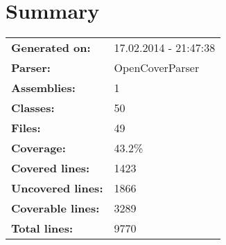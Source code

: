 \documentclass[a4paper,10pt]{article}
\begin{document}
\setcounter{secnumdepth}{-1}
\section{Summary}
\begin{longtable}[l]{ll}
\textbf{Generated on:} & 17.02.2014 - 21:47:38\\
\textbf{Parser:} & OpenCoverParser\\
\textbf{Assemblies:} & 1\\
\textbf{Classes:} & 50\\
\textbf{Files:} & 49\\
\textbf{Coverage:} & 43.2\%\\
\textbf{Covered lines:} & 1423\\
\textbf{Uncovered lines:} & 1866\\
\textbf{Coverable lines:} & 3289\\
\textbf{Total lines:} & 9770\\
\end{longtable}
\end{document}
